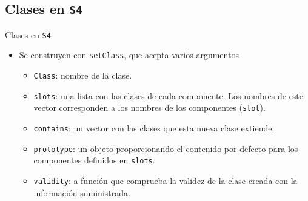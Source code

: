 \documentclass[xcolor={usenames,svgnames,dvipsnames}]{beamer}
\begin{document}
\subsection{Clases en \texttt{S4}}
\label{sec:orgheadline31}
\begin{frame}[fragile,label={sec:orgheadline21}]{Clases en \texttt{S4}}
 \begin{itemize}
\item Se construyen con \texttt{setClass}, que acepta varios argumentos
\begin{itemize}
\item \texttt{Class}: nombre de la clase.
\item \texttt{slots}: una lista con las clases de cada componente. Los nombres de este vector corresponden a los nombres de los componentes (\texttt{slot}).
\item \texttt{contains}: un vector con las clases que esta nueva clase extiende.
\item \texttt{prototype}: un objeto proporcionando el contenido por defecto para los componentes definidos en \texttt{slots}.
\item \texttt{validity}: a función que comprueba la validez de la clase creada con la información suministrada.
\end{itemize}
\end{itemize}
\end{frame}
\end{document}
